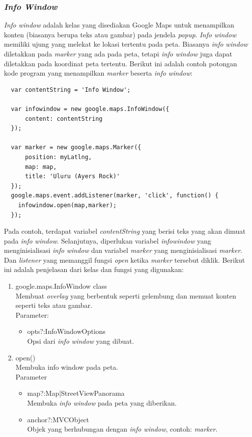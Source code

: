 \subsubsection{\textit{Info Window}}
\textit{Info window} adalah kelas yang disediakan Google Maps untuk menampilkan
konten (biasanya berupa teks atau gambar) pada jendela \textit{popup}.
\textit{Info window} memiliki ujung yang melekat ke lokasi tertentu pada peta.
Biasanya \textit{info window} diletakkan pada \textit{marker} yang ada pada
peta, tetapi \textit{info window} juga dapat diletakkan pada koordinat peta
tertentu. Berikut ini adalah contoh potongan kode program yang menampilkan
\textit{marker} beserta \textit{info window}:
\begin{verbatim}
  var contentString = 'Info Window';

  var infowindow = new google.maps.InfoWindow({
      content: contentString
  });

  var marker = new google.maps.Marker({
      position: myLatlng,
      map: map,
      title: 'Uluru (Ayers Rock)'
  });
  google.maps.event.addListener(marker, 'click', function() {
    infowindow.open(map,marker);
  });
\end{verbatim}
Pada contoh, terdapat variabel \textit{contentString} yang berisi teks yang akan
dimuat pada \textit{info window}. Selanjutnya, diperlukan variabel
\textit{infowindow} yang menginisialisasi \textit{info window} dan variabel
\textit{marker} yang menginisialisasi \textit{marker}. Dan \textit{listener}
yang memanggil fungsi \textit{open} ketika \textit{marker} tersebut diklik.
Berikut ini adalah penjelasan dari kelas dan fungsi yang digunakan:
\begin{enumerate}
\item google.maps.InfoWindow class\\
  Membuat \textit{overlay} yang berbentuk seperti gelembung dan memuat konten
  seperti teks atau gambar.\\
  Parameter:
  \begin{itemize}
    \item opts?:InfoWindowOptions\\
    Opsi dari \textit{info window} yang dibuat.
  \end{itemize}
  
\item open()\\
  Membuka info window pada peta.\\
  Parameter
  \begin{itemize}
    \item map?:Map|StreetViewPanorama\\
    Membuka \textit{info window} pada peta yang diberikan.
    
    \item anchor?:MVCObject\\
    Objek yang berhubungan dengan \textit{info window}, contoh: \textit{marker}.
  \end{itemize}
\end{enumerate}
